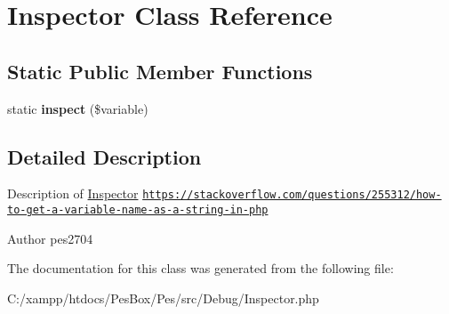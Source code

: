\hypertarget{class_pes_1_1_debug_1_1_inspector}{}\section{Inspector Class Reference}
\label{class_pes_1_1_debug_1_1_inspector}
\subsection*{Static Public Member Functions}
\begin{DoxyCompactItemize}
\item 
\mbox{\label{class_pes_1_1_debug_1_1_inspector_a99c4caec755d412fa5a1cb40dc3894da}} 
static {\bfseries inspect} (\$variable)
\end{DoxyCompactItemize}


\subsection{Detailed Description}
Description of \mbox{\hyperlink{class_pes_1_1_debug_1_1_inspector}{Inspector}} \href{https://stackoverflow.com/questions/255312/how-to-get-a-variable-name-as-a-string-in-php}{\tt https\+://stackoverflow.\+com/questions/255312/how-\/to-\/get-\/a-\/variable-\/name-\/as-\/a-\/string-\/in-\/php}

\begin{DoxyAuthor}{Author}
pes2704 
\end{DoxyAuthor}


The documentation for this class was generated from the following file\+:\begin{DoxyCompactItemize}
\item 
C\+:/xampp/htdocs/\+Pes\+Box/\+Pes/src/\+Debug/Inspector.\+php\end{DoxyCompactItemize}
